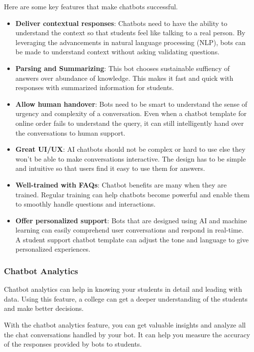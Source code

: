 \documentclass[14pt]{extarticle}
\begin{document}
Here are some key features that make chatbots successful.
\begin{itemize}
    \item \textbf{Deliver contextual responses}: Chatbots need to have the ability to understand the context so that students feel like talking to a real person. By leveraging the advancements in natural language processing (NLP), bots can be made to understand context without asking validating questions.
    \item \textbf{Parsing and Summarizing}: This bot chooses sustainable suffiency of answers over abundance of knowledge. This makes it fast and quick with responses with summarized information for students.
    \item \textbf{Allow human handover}: Bots need to be smart to understand the sense of urgency and complexity of a conversation. Even when a chatbot template for online order fails to understand the query, it can still intelligently hand over the conversations to human support.
    \vspace{2em}
    \item \textbf{Great UI/UX}:  AI chatbots should not be complex or hard to use else they won't be able to make conversations interactive. The design has to be simple and intuitive so that users find it easy to use them for answers.
    \item \textbf{Well-trained with FAQs}:  Chatbot benefits are many when they are trained. Regular training can help chatbots become powerful and enable them to smoothly handle questions and interactions.
    \item \textbf{Offer personalized support}:  Bots that are designed using AI and machine learning can easily comprehend user conversations and respond in real-time. A student support chatbot template can adjust the tone and language to give personalized experiences.
\end{itemize}

\subsubsection{Chatbot Analytics}

Chatbot analytics can help in knowing your students in detail and leading with data. Using this feature, a college can get a deeper understanding of the students and make better decisions.

With the chatbot analytics feature, you can get valuable insights and analyze all the chat conversations handled by your bot. It can help you measure the accuracy of the responses provided by bots to students.
\end{document}

